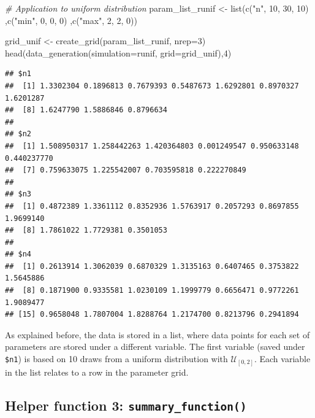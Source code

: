 \documentclass[11pt,a4paper]{article}
\newenvironment{Shaded}{\begin{snugshade}}{\end{snugshade}}
\newcommand{\AttributeTok}[1]{\textcolor[rgb]{0.77,0.63,0.00}{#1}}
\newcommand{\CommentTok}[1]{\textcolor[rgb]{0.56,0.35,0.01}{\textit{#1}}}
\newcommand{\DecValTok}[1]{\textcolor[rgb]{0.00,0.00,0.81}{#1}}
\newcommand{\FunctionTok}[1]{\textcolor[rgb]{0.00,0.00,0.00}{#1}}
\newcommand{\NormalTok}[1]{#1}
\newcommand{\OtherTok}[1]{\textcolor[rgb]{0.56,0.35,0.01}{#1}}
\newcommand{\StringTok}[1]{\textcolor[rgb]{0.31,0.60,0.02}{#1}}
\begin{document}
\begin{Shaded}
\begin{Highlighting}[]
\CommentTok{\# Application to uniform distribution}
\NormalTok{param\_list\_runif }\OtherTok{\textless{}{-}} \FunctionTok{list}\NormalTok{(}\FunctionTok{c}\NormalTok{(}\StringTok{"n"}\NormalTok{, }\DecValTok{10}\NormalTok{, }\DecValTok{30}\NormalTok{, }\DecValTok{10}\NormalTok{)}
\NormalTok{                         ,}\FunctionTok{c}\NormalTok{(}\StringTok{"min"}\NormalTok{, }\DecValTok{0}\NormalTok{, }\DecValTok{0}\NormalTok{, }\DecValTok{0}\NormalTok{)}
\NormalTok{                         ,}\FunctionTok{c}\NormalTok{(}\StringTok{"max"}\NormalTok{, }\DecValTok{2}\NormalTok{, }\DecValTok{2}\NormalTok{, }\DecValTok{0}\NormalTok{))}


\NormalTok{grid\_unif }\OtherTok{\textless{}{-}} \FunctionTok{create\_grid}\NormalTok{(param\_list\_runif, }\AttributeTok{nrep=}\DecValTok{3}\NormalTok{)}
\FunctionTok{head}\NormalTok{(}\FunctionTok{data\_generation}\NormalTok{(}\AttributeTok{simulation=}\NormalTok{runif, }\AttributeTok{grid=}\NormalTok{grid\_unif),}\DecValTok{4}\NormalTok{)}
\end{Highlighting}
\end{Shaded}

\begin{verbatim}
## $n1
##  [1] 1.3302304 0.1896813 0.7679393 0.5487673 1.6292801 0.8970327 1.6201287
##  [8] 1.6247790 1.5886846 0.8796634
## 
## $n2
##  [1] 1.508950317 1.258442263 1.420364803 0.001249547 0.950633148 0.440237770
##  [7] 0.759633075 1.225542007 0.703595818 0.222270849
## 
## $n3
##  [1] 0.4872389 1.3361112 0.8352936 1.5763917 0.2057293 0.8697855 1.9699140
##  [8] 1.7861022 1.7729381 0.3501053
## 
## $n4
##  [1] 0.2613914 1.3062039 0.6870329 1.3135163 0.6407465 0.3753822 1.5645886
##  [8] 0.1871900 0.9335581 1.0230109 1.1999779 0.6656471 0.9772261 1.9089477
## [15] 0.9658048 1.7807004 1.8288764 1.2174700 0.8213796 0.2941894
\end{verbatim}

As explained before, the data is stored in a list, where data points for
each set of parameters are stored under a different variable. The first
variable (saved under \texttt{\$n1}) is based on 10 draws from a uniform
distribution with \(\mathcal{U}_{[0,2]}\). Each variable in the list
relates to a row in the parameter grid.

\hypertarget{helper-function-3-summary_function}{%
\subsection{\texorpdfstring{Helper function 3:
\texttt{summary\_function()}}{Helper function 3: summary\_function()}}\label{helper-function-3-summary_function}}
\end{document}
